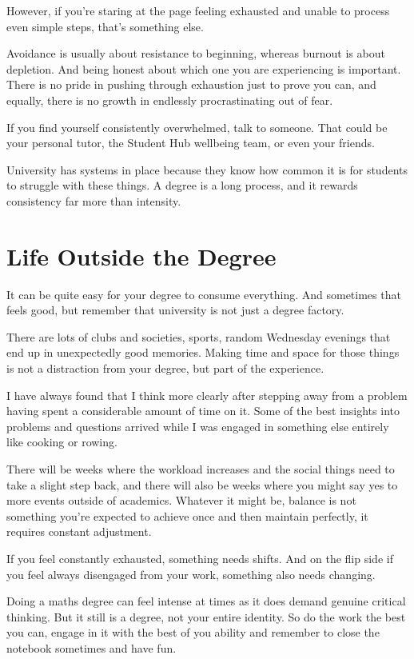 However, if you're staring at the page feeling exhausted and unable to process even simple steps, that’s something else.

Avoidance is usually about resistance to beginning, whereas burnout is about depletion. And being honest about which one you are experiencing is important. There is no pride in pushing through exhaustion just to prove you can, and equally, there is no growth in endlessly procrastinating out of fear.

If you find yourself consistently overwhelmed, talk to someone. That could be your personal tutor, the Student Hub wellbeing team, or even your friends. 

University has systems in place because they know how common it is for students to struggle with these things. A degree is a long process, and it rewards consistency far more than intensity. 


\section{Life Outside the Degree} 

It can be quite easy for your degree to consume everything. And sometimes that feels good, but remember that university is not just a degree factory. 

There are lots of clubs and societies, sports, random Wednesday evenings that end up in unexpectedly good memories. Making time and space for those things is not a distraction from your degree, but part of the experience. 

I have always found that I think more clearly after stepping away from a problem having spent a considerable amount of time on it. Some of the best insights into problems and questions arrived while I was engaged in something else entirely like cooking or rowing. 

There will be weeks where the workload increases and the social things need to take a slight step back, and there will also be weeks where you might say yes to more events outside of academics. Whatever it might be, balance is not something you're expected to achieve once and then maintain perfectly, it requires constant adjustment. 

If you feel constantly exhausted, something needs shifts. And on the flip side if you feel always disengaged from your work, something also needs changing. 

Doing a maths degree can feel intense at times as it does demand genuine critical thinking. But it still is a degree, not your entire identity. So do the work the best you can, engage in it with the best of you ability and remember to close the notebook sometimes and have fun. 


